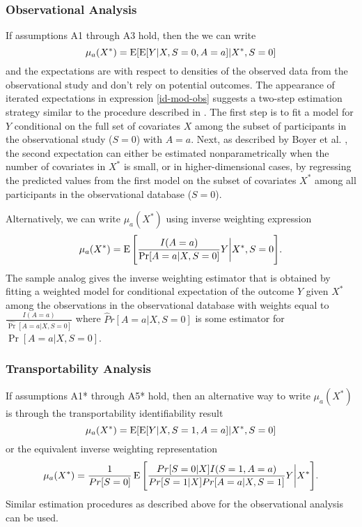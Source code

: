 \documentclass[11pt]{article}
\DeclareMathOperator{\E}{\textnormal{\mbox{E}}}
\begin{document}
\subsubsection*{Observational Analysis}
If assumptions A1 through A3 hold, then the we can write 
\begin{equation}
\label{id-mod-obs}
\mu_a(X^*) =  \E [\E[Y | X, S=0,A=a] |X^* , S=0]
\end{equation}
and the expectations are with respect to densities of the observed data from the observational study and don't rely on potential outcomes. The appearance of iterated expectations in expression \eqref{id-mod-obs} suggests a two-step estimation strategy similar to the procedure described in \cite{boyer2023new}. The first step is to fit a model for $Y$ conditional on the full set of covariates $X$ among the subset of participants in the observational study ($S=0$) with $A=a$.  Next, as described by Boyer et al. \cite{boyer2023new}, the second expectation can either be estimated nonparametrically when the number of covariates in $X^*$ is small, or in higher-dimensional cases, by regressing the predicted values from the first model on the subset of covariates $X^*$ among all participants in the observational database ($S=0$).

Alternatively, we can write $\mu_a(X^*)$ using inverse weighting expression
\begin{align*}
      \mu_a(X^*) = \E\Bigg[\frac{I(A=a)}{\Pr[A=a|X,S=0]}   Y  \bigg| X^* , S=0\Bigg].
\end{align*}
The sample analog gives the inverse weighting estimator that is obtained by fitting a weighted model for conditional expectation of the outcome $Y$ given $X^*$ among the observations in the observational database with weights equal to $\frac{I(A=a)}{\widehat \Pr[A=a|X,S=0]}$ where $\widehat Pr[A=a|X,S=0]$ is some estimator for $\Pr[A=a|X,S=0]$. 

\subsubsection*{Transportability Analysis}
If assumptions A1* through A5* hold, then an alternative way to write $\mu_a(X^*)$ is through the transportability identifiability result
\begin{equation}
    \mu_a(X^*) =  \E [\E[Y | X, S=1,A=a] |X^* , S=0]
    \label{id-tr-mod}
\end{equation} 
or the equivalent inverse weighting representation
\begin{align*}
   \mu_a(X^*) = \frac{1}{Pr[S=0]} \E\Bigg[ \frac{Pr[S=0|X]I(S=1,A=a)}{Pr[S=1|X]Pr[A=a|X,S=1]} Y  \bigg|X^*\Bigg].  %
\end{align*}
Similar estimation procedures as described above for the observational analysis can be used.
\end{document}
